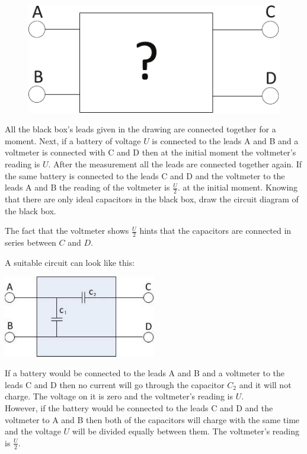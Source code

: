 {\ifEngStatement
\begin{figure}%
\includegraphics[width=\linewidth]{2013-v3g-04-pilt1}%
\end{figure}
All the black box’s leads given in the drawing are connected together for a moment. Next, if a battery of voltage $U$ is connected to the leads A and B and a voltmeter is connected with C and D then at the initial moment the voltmeter’s reading is $U$. After the measurement all the leads are connected together again. If the same battery is connected to the leads C and D and the voltmeter to the leads A and B the reading of the voltmeter is $\frac{U}{2}.$ at the initial moment. Knowing that there are only ideal capacitors in the black box, draw the circuit diagram of the black box.
\fi


\ifEngHint
The fact that the voltmeter shows $\frac{U}{2}$ hints that the capacitors are connected in series between $C$ and $D$.
\fi


\ifEngSolution
A suitable circuit can look like this:
\begin{center}
\includegraphics[width=0.5\textwidth]{2013-v3g-04-mustkastlah}\\
\end{center}
If a battery would be connected to the leads A and B and a voltmeter to the leads C and D then no current will go through the capacitor $C_2$ and it will not charge. The voltage on it is zero and the voltmeter’s reading is $U$.\\
However, if the battery would be connected to the leads C and D and the voltmeter to A and B then both of the capacitors will charge with the same time and the voltage $U$ will be divided equally between them. The voltmeter’s reading is $\frac{U}{2}$.
\fi
}